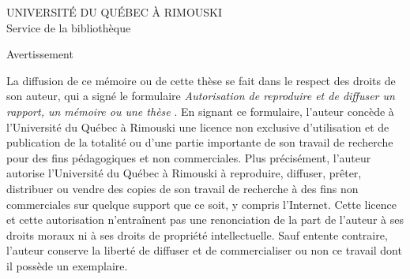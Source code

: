 \thispagestyle{empty}

\vspace{2cm}
\begin{center}
UNIVERSITÉ DU QUÉBEC À RIMOUSKI\\
Service de la bibliothèque
\end{center}

\vspace{3cm}
\begin{center}
Avertissement
\end{center}


\vspace{1cm}

\noindent La diffusion de ce mémoire ou de cette thèse se fait dans le respect des droits de son auteur, qui a signé le formulaire {\itshape \og Autorisation de reproduire et de diffuser un rapport, un mémoire ou une thèse \fg}. 
En signant ce formulaire, l’auteur concède à l’Université du Québec à Rimouski une licence non exclusive d’utilisation et de publication de la totalité ou d’une partie importante de son travail de recherche pour des fins pédagogiques et non commerciales. 
Plus précisément, l’auteur autorise l’Université du Québec à Rimouski à reproduire, diffuser, prêter, distribuer ou vendre des copies de son travail de recherche à des fins non commerciales sur quelque support que ce soit, y compris l’Internet. 
Cette licence et cette autorisation n’entraînent pas une renonciation de la part de l’auteur à ses droits moraux ni à ses droits de propriété intellectuelle. 
Sauf entente contraire, l’auteur conserve la liberté de diffuser et de commercialiser ou non ce travail dont il possède un exemplaire.



\cleardoublepage